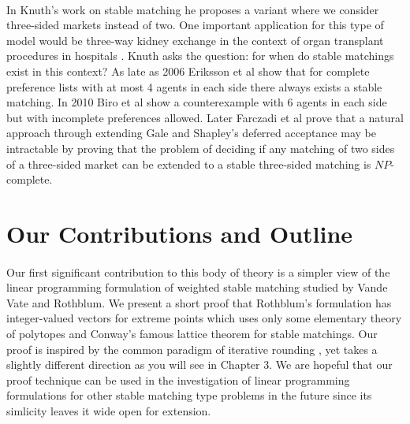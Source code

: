 \paragraph{}
In Knuth's work on stable matching he proposes a variant where we consider three-sided markets instead of two. One important application for this type of model would be three-way kidney exchange in the context of organ transplant procedures in hospitals \cite{saidman2006increasing}. Knuth asks the question: for when do stable matchings exist in this context? As late as 2006 Eriksson et al \cite{eriksson2006three} show that for complete preference lists with at most 4 agents in each side there always exists a stable matching. In 2010 Biro et al \cite{biro2010three} show a counterexample with 6 agents in each side but with incomplete preferences allowed. Later Farczadi et al \cite{farczadi2014stable} prove that a natural approach through extending Gale and Shapley's deferred acceptance may be intractable by proving that the problem of deciding if any matching of two sides of a three-sided market can be extended to a stable three-sided matching is $NP$-complete.

\section{Our Contributions and Outline}

\paragraph{}
Our first significant contribution to this body of theory is a simpler view of the linear programming formulation of weighted stable matching studied by Vande Vate and Rothblum. We present a short proof that Rothblum's formulation has integer-valued vectors for extreme points which uses only some elementary theory of polytopes and Conway's famous lattice theorem for stable matchings. Our proof is inspired by the common paradigm of iterative rounding \cite{lau2011iterative}, yet takes a slightly different direction as you will see in Chapter $3$. We are hopeful that our proof technique can be used in the investigation of linear programming formulations for other stable matching type problems in the future since its simlicity leaves it wide open for extension.
